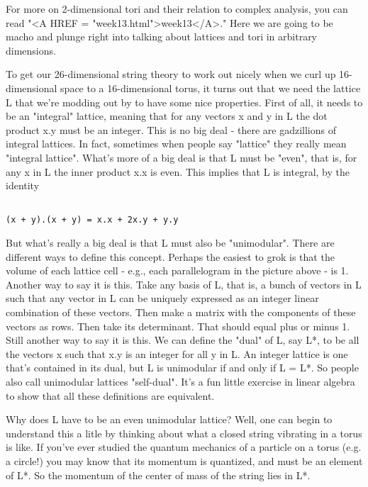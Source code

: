 For more on 2-dimensional tori and their relation to complex analysis,
you can read "<A HREF = "week13.html">week13</A>."  Here we are going to be macho and plunge right
into talking about lattices and tori in arbitrary dimensions.  

To get our 26-dimensional string theory to work out nicely when we
curl up 16-dimensional space to a 16-dimensional torus, it turns
out that we need the lattice L that we're modding out by to have some
nice properties.  First of all, it needs to be an "integral" lattice,
meaning that for any vectors x and y in L the dot product x.y must
be an integer.  This is no big deal - there are gadzillions of
integral lattices.  In fact, sometimes when people say "lattice" they 
really mean "integral lattice".  What's more of a big deal is that 
L must be "even", that is, for any x in L the inner product x.x is 
even.  This implies that L is integral, by the identity


\begin{verbatim}

(x + y).(x + y) = x.x + 2x.y + y.y
\end{verbatim}
    
But what's really a big deal is that L must also be "unimodular".
There are different ways to define this concept.  Perhaps the easiest 
to grok is that the volume of each lattice cell - e.g., each 
parallelogram in the picture above - is 1.  Another way to say it 
is this.  Take any basis of L, that is, a bunch of vectors in L
such that any vector in L can be uniquely expressed as an integer
linear combination of these vectors.  Then make a matrix with the 
components of these vectors as rows.  Then take its determinant.  
That should equal plus or minus 1.  Still another way to say it
is this.  We can define the "dual" of L, say L*, to be all the 
vectors x such that x.y is an integer for all y in L.  An integer
lattice is one that's contained in its dual, but L is unimodular if 
and only if L = L*.   So people also call unimodular lattices 
"self-dual".  It's a fun little exercise in linear algebra to show 
that all these definitions are equivalent.  

Why does L have to be an even unimodular lattice?  Well, one
can begin to understand this a litle by thinking about what a closed 
string vibrating in a torus is like.   If you've ever studied the 
quantum mechanics of a particle on a torus (e.g. a circle!) you may 
know that its momentum is quantized, and must be an element of L*.  So 
the momentum of the center of mass of the string lies in L*.  

